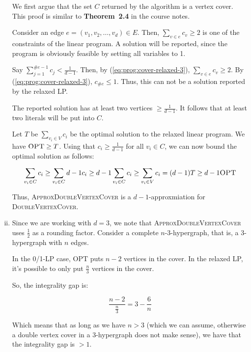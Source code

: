 \begin{enumerate}[(i)]
		We first argue that the set $C$ returned by the algorithm is a vertex cover.
		This proof is similar to \textbf{Theorem~2.4} in the course notes.

		Consider an edge $e = (v_1, v_2, \ldots, v_d) \in E$.
		Then, $\sum_{v \in e}{c_v} \geq 2$ is one of the constraints of the linear program.
		A solution will be reported, since the program is obviously feasible by setting all variables to 1.

		Say $\sum_{j=1}^{\#e - 1}{c_j} < \frac{1}{d-1}$.
		Then, by (\ref{eq:prog:cover-relaxed-3}), $\sum_{v \in e}{c_v} \geq 2$.
		By (\ref{eq:prog:cover-relaxed-3}), $c_{\#e} \leq 1$.
		Thus, this can not be a solution reported by the relaxed LP.

		The reported solution has at least two vertices $\geq \frac{1}{d-1}$.
		It follows that at least two literals will be put into $C$.

		Let $T$ be $\sum_{v_i \in V} c_i$ be the optimal solution to the relaxed linear program.
		We have $\textsc{OPT} \geq T$.
		Using that $c_i \geq \frac{1}{d-1}$ for all $v_i \in C$, we can now bound the optimal solution as follows:

		\[
			\sum_{v_i \in C} c_i \geq \sum_{v_i \in C} d-1 c_i \geq d-1 \sum_{v_i \in C} c_i \geq \sum_{v_i \in V} c_i = (d-1)T \geq d-1 \textsc{OPT}
		\]

		Thus, \textsc{ApproxDoubleVertexCover} is a $d-1$-approxmiation for \textsc{DoubleVertexCover}.
	\item Since we are working with $d=3$, we note that \textsc{ApproxDoubleVertexCover} uses $\frac{1}{2}$ as a rounding factor.
		Consider a complete $n$-3-hypergraph, that is, a 3-hypergraph with $n$ edges.

		In the 0/1-LP case, OPT puts $n-2$ vertices in the cover.
		In the relaxed LP, it's possible to only put $\frac{n}{3}$ vertices in the cover.

		So, the integrality gap is:

		\[
			\frac{n-2}{\frac{n}{3}} = 3 - \frac{6}{n}
		\]

		Which means that as long as we have $n > 3$ (which we can assume, otherwise a double vertex cover in a 3-hypergraph does not make sense), we have that the integrality gap is $>1$.
\end{enumerate}
